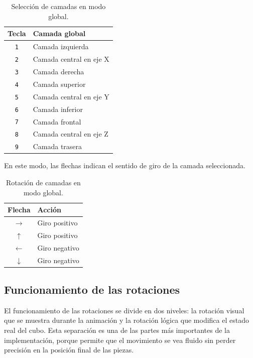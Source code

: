 \documentclass[12pt,a4paper]{article}
\begin{document}
\begin{table}[H]
\centering
\begin{tabular}{|c|l|}
\hline
\textbf{Tecla} & \textbf{Camada global} \\ \hline
\texttt{1} & Camada izquierda \\ \hline
\texttt{2} & Camada central en eje X \\ \hline
\texttt{3} & Camada derecha \\ \hline
\texttt{4} & Camada superior \\ \hline
\texttt{5} & Camada central en eje Y \\ \hline
\texttt{6} & Camada inferior \\ \hline
\texttt{7} & Camada frontal \\ \hline
\texttt{8} & Camada central en eje Z \\ \hline
\texttt{9} & Camada trasera \\ \hline
\end{tabular}
\caption{Selección de camadas en modo global.}
\end{table}

En este modo, las flechas indican el sentido de giro de la camada seleccionada.

\begin{table}[H]
\centering
\begin{tabular}{|c|l|}
\hline
\textbf{Flecha} & \textbf{Acción} \\ \hline
$\rightarrow$ & Giro positivo \\ \hline
$\uparrow$ & Giro positivo \\ \hline
$\leftarrow$ & Giro negativo \\ \hline
$\downarrow$ & Giro negativo \\ \hline
\end{tabular}
\caption{Rotación de camadas en modo global.}
\end{table}


\subsection{Funcionamiento de las rotaciones}

El funcionamiento de las rotaciones se divide en dos niveles: la rotación visual que se muestra durante la animación y la rotación lógica que modifica el estado real del cubo. Esta separación es una de las partes más importantes de la implementación, porque permite que el movimiento se vea fluido sin perder precisión en la posición final de las piezas.
\end{document}

